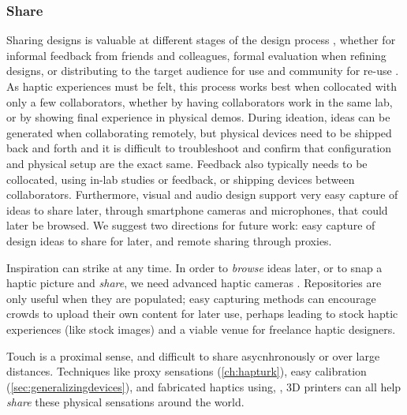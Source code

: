 \subsubsection{Share} 
Sharing designs is valuable at different stages of the design process \cite{Kulkarni2014}, whether for informal feedback from friends and colleagues, formal evaluation when refining designs, or distributing to the target audience for use and community for re-use \cite{Shneiderman2007}.
As haptic experiences must be felt, this process works best when collocated with only a few collaborators, whether by having collaborators work in the same lab, or by showing final experience in physical demos.
During ideation, ideas can be generated when collaborating remotely, but physical devices need to be shipped back and forth and it is difficult to troubleshoot and confirm that configuration and physical setup are the exact same.
Feedback also typically needs to be collocated, using in-lab studies or feedback, or shipping devices between collaborators.
Furthermore, visual and audio design support very easy capture of ideas to share later, through smartphone cameras and microphones, that could later be browsed.
We suggest two  directions for future work: easy capture of design ideas to share for later, and remote sharing through proxies.

Inspiration can strike at any time.
In order to \emph{browse} ideas later, or to snap a haptic picture and \emph{share}, we need advanced haptic cameras \cite{MacLean1996}.
Repositories are only useful when they are populated; easy capturing methods can encourage crowds to upload their own content for later use, perhaps leading to stock haptic experiences (like stock images) and a viable venue for freelance haptic designers.

Touch is a proximal sense, and difficult to share asycnhronously or over large distances.
Techniques like proxy sensations (\autoref{ch:hapturk}), easy calibration (\autoref{sec:generalizingdevices}), and fabricated haptics using, \eg, 3D printers \cite{torres2015hapticprint} can all help \emph{share} these physical sensations around the world.


